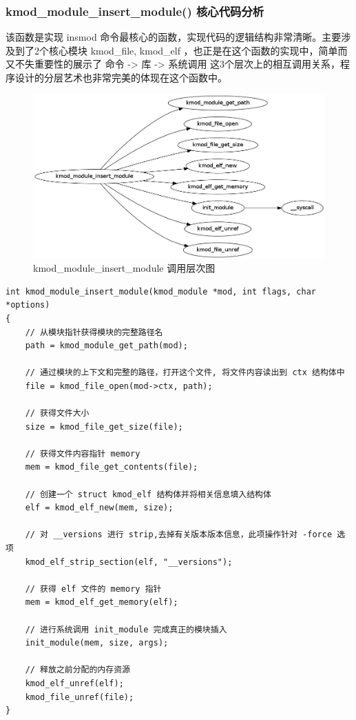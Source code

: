 \documentclass[11pt,a4paper]{article}
\makeatletter
\def\maxwidth{\ifdim\Gin@nat@width>\linewidth\linewidth
\else\Gin@nat@width\fi}
\let\Oldincludegraphics\includegraphics
\renewcommand{\includegraphics}[1]{\Oldincludegraphics[width=\maxwidth]{#1}}
\makeatother
\begin{document}
\subsubsection{kmod\_module\_insert\_module() 核心代码分析}

该函数是实现 insmod
命令最核心的函数，实现代码的逻辑结构非常清晰。主要涉及到了2个核心模块
kmod\_file, kmod\_elf
，也正是在这个函数的实现中，简单而又不失重要性的展示了 命令
-\textgreater{} 库 -\textgreater{} 系统调用
这3个层次上的相互调用关系，程序设计的分层艺术也非常完美的体现在这个函数中。

\begin{figure}[htbp]
\centering
\includegraphics{./figures/kmod_module_insert_module.jpg}
\caption{kmod\_module\_insert\_module 调用层次图}
\end{figure}

{\begin{shaded}\begin{verbatim}
int kmod_module_insert_module(kmod_module *mod, int flags, char *options)
{
    // 从模块指针获得模块的完整路径名
    path = kmod_module_get_path(mod);

    // 通过模块的上下文和完整的路径，打开这个文件, 将文件内容读出到 ctx 结构体中
    file = kmod_file_open(mod->ctx, path);

    // 获得文件大小
    size = kmod_file_get_size(file);

    // 获得文件内容指针 memory
    mem = kmod_file_get_contents(file);

    // 创建一个 struct kmod_elf 结构体并将相关信息填入结构体
    elf = kmod_elf_new(mem, size);

    // 对 __versions 进行 strip,去掉有关版本版本信息，此项操作针对 -force 选项
    kmod_elf_strip_section(elf, "__versions");

    // 获得 elf 文件的 memory 指针
    mem = kmod_elf_get_memory(elf);

    // 进行系统调用 init_module 完成真正的模块插入
    init_module(mem, size, args);

    // 释放之前分配的内存资源
    kmod_elf_unref(elf);
    kmod_file_unref(file);
}
\end{verbatim}\end{shaded}}
\end{document}
